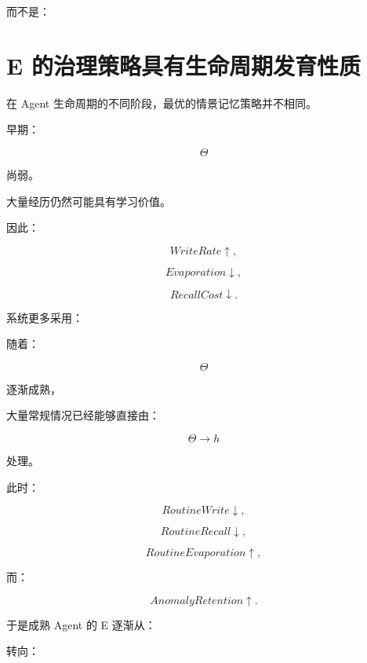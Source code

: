 而不是：

\begin{statementbox}
\centering
{}
\end{statementbox}


\section{E 的治理策略具有生命周期发育性质}

在 Agent 生命周期的不同阶段，最优的情景记忆策略并不相同。

早期：

\[
\Theta
\]

尚弱。

大量经历仍然可能具有学习价值。

因此：

\[
WriteRate\uparrow,
\]

\[
Evaporation\downarrow,
\]

\[
RecallCost\downarrow.
\]

系统更多采用：

\begin{statementbox}
\centering
{}
\end{statementbox}

随着：

\[
\Theta
\]

逐渐成熟，

大量常规情况已经能够直接由：

\[
\Theta\rightarrow h
\]

处理。

此时：

\[
RoutineWrite\downarrow,
\]

\[
RoutineRecall\downarrow,
\]

\[
RoutineEvaporation\uparrow,
\]

而：

\[
AnomalyRetention\uparrow.
\]

于是成熟 Agent 的 E 逐渐从：

\begin{statementbox}
\centering
{}
\end{statementbox}

转向：

\begin{statementbox}
\centering
{}
\end{statementbox}

